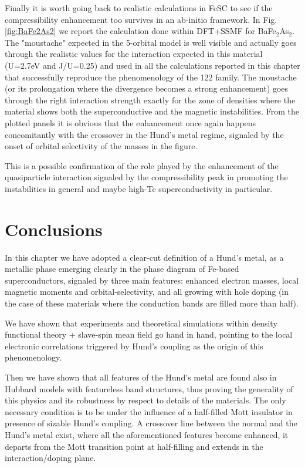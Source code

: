 \documentclass[12pt,twoside]{article}
\begin{document}
Finally it is worth going back to realistic calculations in FeSC to see if the compressibility enhancement too survives in an ab-initio framework.
In Fig. \ref{fig:BaFe2As2} we report the calculation done within DFT+SSMF for BaFe$_2$As$_2$. The "moustache" expected in the 5-orbital model is well visible and actually goes through the realistic values for the interaction expected in this material (U=2.7eV and J/U=0.25) and used in all the calculations reported in this chapter that successfully reproduce the phenomenology of the 122 family. The moustache (or its prolongation where the divergence becomes a strong enhancement) goes through the right interaction strength exactly for the zone of densities where the material shows both the superconductive and the magnetic instabilities. From the plotted panels it is obvious that the enhancement once again happens concomitantly with the crossover in the Hund's metal regime, signaled by the onset of orbital selectivity of the masses in the figure.

This is a possible confirmation of the role played by the enhancement of the quasiparticle interaction signaled by the compressibility peak in promoting the instabilities in general and maybe high-Tc superconductivity in particular.

\section{Conclusions}

In this chapter we have adopted a clear-cut definition of a Hund's metal, as a metallic phase emerging clearly in the phase diagram of Fe-based superconductors, signaled by three main features: enhanced electron masses, local magnetic moments and orbital-selectivity, and all growing with hole doping (in the case of these materials where the conduction bands are filled more than half). 

We have shown that experiments and theoretical simulations within density functional theory + slave-spin mean field go hand in hand, pointing to the local electronic correlations triggered by Hund's coupling as the origin of this phenomenology.

Then we have shown that all features of the Hund's metal are found also in Hubbard models with featureless band structures, thus proving the generality of this physics and its robustness by respect to details of the materials. The only necessary condition is to be under the influence of a half-filled Mott insulator in presence of sizable Hund's coupling. A crossover line between the normal and the Hund's metal exist, where all the aforementioned features become enhanced, it departs from the Mott transition point at half-filling and extends in the interaction/doping plane.
 
\end{document}
